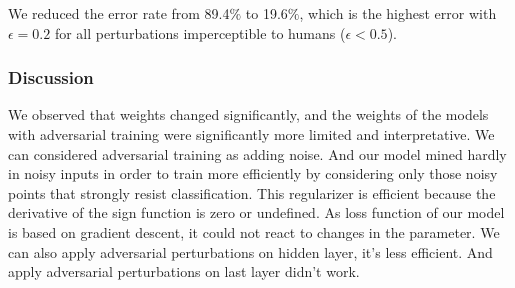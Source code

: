 We reduced the error rate from 89.4$\%$ to 19.6$\%$, which is the highest error with $\epsilon = 0.2$ for all perturbations imperceptible to humans ($\epsilon < 0.5$).
\subsubsection{Discussion}
We observed that weights changed significantly, and the weights of the models with adversarial training were significantly more limited and interpretative. We can considered adversarial training as adding noise. And our model mined hardly in noisy inputs in order to train more efficiently by considering only those noisy points that strongly resist classification. This regularizer is efficient because the derivative of the sign function is zero or undefined. As loss function of our model is based on gradient descent, it could not react to changes in the parameter. We can also apply adversarial perturbations on hidden layer, it's less efficient. And apply adversarial perturbations on last layer didn't work. 



